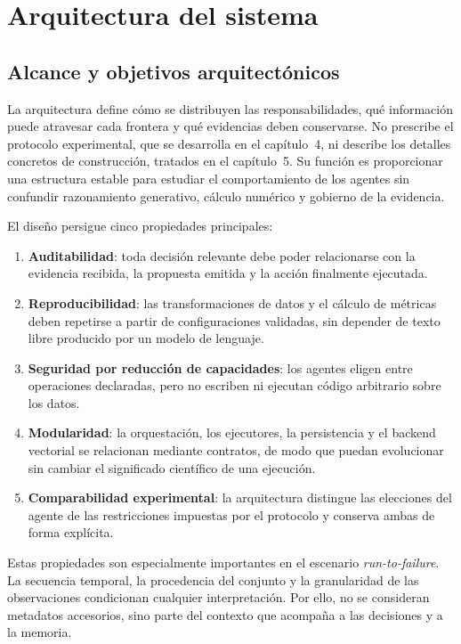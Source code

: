 \chapter{Arquitectura del sistema}\label{chap:arquitectura}

\section{Alcance y objetivos arquitectónicos}

La arquitectura define cómo se distribuyen las responsabilidades, qué
información puede atravesar cada frontera y qué evidencias deben conservarse.
No prescribe el protocolo experimental, que se desarrolla en el
capítulo~4, ni describe los detalles concretos de construcción, tratados en el
capítulo~5. Su función es proporcionar una estructura estable para estudiar el
comportamiento de los agentes sin confundir razonamiento generativo, cálculo
numérico y gobierno de la evidencia.

El diseño persigue cinco propiedades principales:

\begin{enumerate}
  \item \textbf{Auditabilidad}: toda decisión relevante debe poder relacionarse
        con la evidencia recibida, la propuesta emitida y la acción finalmente
        ejecutada.
  \item \textbf{Reproducibilidad}: las transformaciones de datos y el cálculo
        de métricas deben repetirse a partir de configuraciones validadas, sin
        depender de texto libre producido por un modelo de lenguaje.
  \item \textbf{Seguridad por reducción de capacidades}: los agentes eligen
        entre operaciones declaradas, pero no escriben ni ejecutan código
        arbitrario sobre los datos.
  \item \textbf{Modularidad}: la orquestación, los ejecutores, la persistencia
        y el backend vectorial se relacionan mediante contratos, de modo que
        puedan evolucionar sin cambiar el significado científico de una
        ejecución.
  \item \textbf{Comparabilidad experimental}: la arquitectura distingue las
        elecciones del agente de las restricciones impuestas por el protocolo
        y conserva ambas de forma explícita.
\end{enumerate}

Estas propiedades son especialmente importantes en el escenario
\textit{run-to-failure}. La secuencia temporal, la procedencia del conjunto y
la granularidad de las observaciones condicionan cualquier interpretación. Por
ello, no se consideran metadatos accesorios, sino parte del contexto que
acompaña a las decisiones y a la memoria.

